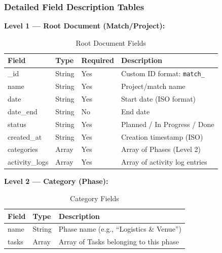 \documentclass[a4paper,12pt]{article}
\begin{document}
\subsubsection{Detailed Field Description Tables}

\textbf{Level 1 --- Root Document (Match/Project):}
\begin{table}[H]
\centering
\begin{tabular}{|l|l|l|p{5.5cm}|}
\hline
\textbf{Field} & \textbf{Type} & \textbf{Required} & \textbf{Description} \\ \hline
\_id & String & Yes & Custom ID format: \texttt{match\_<uuid8>} \\ \hline
name & String & Yes & Project/match name \\ \hline
date & String & Yes & Start date (ISO format) \\ \hline
date\_end & String & No & End date \\ \hline
status & String & Yes & Planned / In Progress / Done \\ \hline
created\_at & String & Yes & Creation timestamp (ISO) \\ \hline
categories & Array & Yes & Array of Phases (Level 2) \\ \hline
activity\_logs & Array & Yes & Array of activity log entries \\ \hline
\end{tabular}
\caption{Root Document Fields}
\end{table}

\textbf{Level 2 --- Category (Phase):}
\begin{table}[H]
\centering
\begin{tabular}{|l|l|p{7cm}|}
\hline
\textbf{Field} & \textbf{Type} & \textbf{Description} \\ \hline
name & String & Phase name (e.g., ``Logistics \& Venue'') \\ \hline
tasks & Array & Array of Tasks belonging to this phase \\ \hline
\end{tabular}
\caption{Category Fields}
\end{table}
\end{document}
